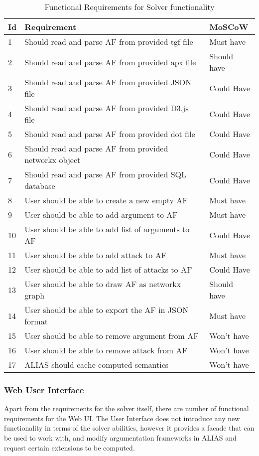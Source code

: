 	\begin{longtable}{|p{0.5cm}|p{10cm}|p{2.5cm}|}
		\caption{Functional Requirements for Solver functionality}
		\label{table:functReqFunctionality}\\
		\hline
		\textbf{Id} & \textbf{Requirement} & \textbf{MoSCoW}  \\ \hline \hline
		1 & Should read and parse AF from provided tgf file & Must have \\ \hline
		2 & Should read and parse AF from provided apx file & Should have \\ \hline
		3 & Should read and parse AF from provided JSON file & Could Have \\ \hline
		4 & Should read and parse AF from provided D3.js file & Could Have \\ \hline
		5 & Should read and parse AF from provided dot file & Could Have \\ \hline
		6 & Should read and parse AF from provided networkx object & Could Have \\ \hline
		7 & Should read and parse AF from provided SQL database & Could Have \\ \hline
		8 & User should be able to create a new empty AF & Must have \\ \hline
		9 & User should be able to add argument to AF & Must have \\ \hline
		10 & User should be able to add list of arguments to AF & Could Have \\ \hline
		11 & User should be able to add attack to AF & Must have \\ \hline
		12 & User should be able to add list of attacks to AF & Could Have \\ \hline
		13 & User should be able to draw AF as networkx graph & Should have \\ \hline
		14 & User should be able to export the AF in JSON format & Must have \\ \hline
		15 & User should be able to remove argument from AF & Won't have \\ \hline
		16 & User should be able to remove attack from AF & Won't have \\ \hline
		17 & ALIAS should cache computed semantics & Won't have \\ \hline
	\end{longtable}%

\subsubsection{Web User Interface} \label{section:WebUIRequirements}
Apart from the requirements for the solver itself, there are number of functional requirements for the Web UI. The User Interface does not introduce any new functionality in terms of the solver abilities, however it provides a facade that can be used to work with, and modify argumentation frameworks in ALIAS and request certain extensions to be computed. 

